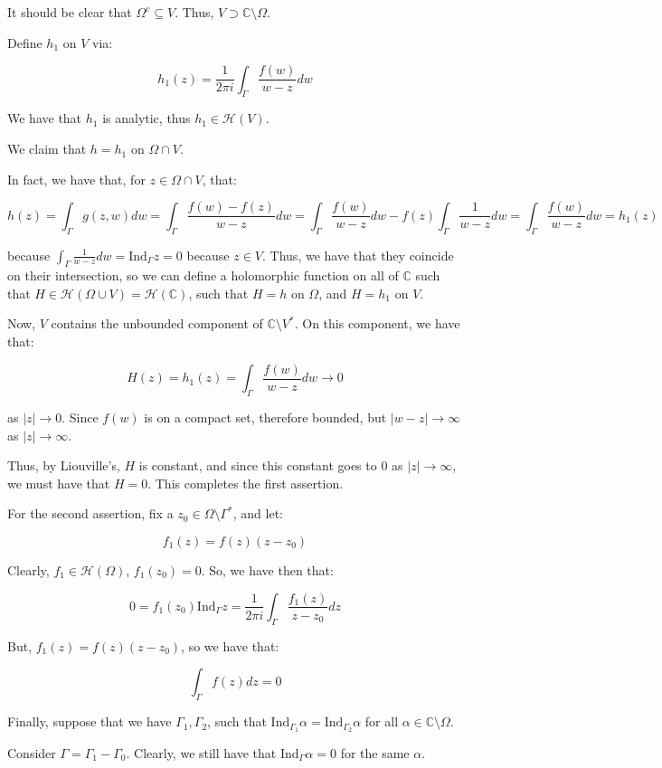 \documentclass[10pt]{article}
\newcommand{\calH}{\mathcal{H}}
\newcommand{\ind}{\text{Ind}}
\begin{document}
It should be clear that $\Omega^c \subseteq V$. Thus, $V \supset \mathbb{C} \setminus \Omega$.

Define $h_1$ on $V$ via:

$$h_1(z) =  \frac{1}{2\pi i} \int_\Gamma \frac{f(w)}{w - z} dw $$

We have that $h_1$ is analytic, thus $h_1 \in \calH(V)$.

We claim that $h = h_1$ on $\Omega \cap V$.

In fact, we have that, for $z \in \Omega \cap V$, that:

$$h(z) = \int_\Gamma g(z,w) dw = \int_\Gamma \frac{f(w) - f(z)}{w - z} dw = \int_\Gamma \frac{f(w)}{w - z} dw - f(z) \int_\Gamma \frac{1}{w - z} dw = \int_\Gamma \frac{f(w)}{w - z} dw = h_1(z) $$

because $\int_\Gamma \frac{1}{w - z} dw = \ind_\Gamma z = 0$ because $z \in V$. Thus, we have that they coincide on their intersection, so we can define a holomorphic function on all of $\mathbb{C}$ such that $H \in \calH(\Omega \cup V) = \calH(\mathbb{C})$, such that $H = h$ on $\Omega$, and $H = h_1$ on $V$.

Now, $V$ contains the unbounded component of $\mathbb{C} \setminus V^*$. On this component, we have that:

$$H(z) = h_1(z) = \int_\Gamma \frac{f(w)}{w - z} dw \to 0$$

as $| z| \to 0 $. Since $f(w)$ is on a compact set, therefore bounded, but $|w - z| \to \infty$ as $|z| \to \infty$.

Thus, by Liouville’s, $H$ is constant, and since this constant goes to 0 as $|z| \to \infty$, we must have that $H = 0$. This completes the first assertion. 

For the second assertion, fix a $z_0 \in \Omega \setminus \Gamma^*$, and let:

$$f_1(z) = f(z)(z - z_0)$$

Clearly, $f_1 \in \calH(\Omega)$, $f_1(z_0) = 0$. So, we have then that:

$$ 0 = f_1(z_0) \ind_\Gamma z = \frac{1}{2\pi i} \int_\Gamma \frac{f_1(z)}{z - z_0} dz $$

But, $f_1(z) = f(z) (z - z_0)$, so we have that:

$$ \int_\Gamma f(z) dz = 0$$

Finally, suppose that we have $\Gamma_1, \Gamma_2$, such that $\ind_{\Gamma_1} \alpha = \ind_{\Gamma_2} \alpha$ for all $\alpha \in \mathbb{C} \setminus \Omega$.

Consider $\Gamma = \Gamma_1 - \Gamma_0$. Clearly, we still have that $\ind_\Gamma \alpha = 0$ for the same $\alpha$.
\end{document}
